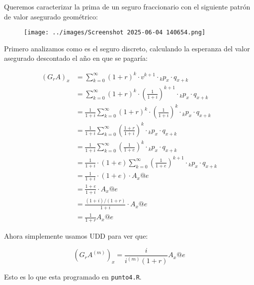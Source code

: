 Queremos caracterizar la prima de un seguro fraccionario con el siguiente patrón de valor asegurado geométrico:

\begin{figure}[H]
    \centering
    \texttt{[image: ../images/Screenshot 2025-06-04 140654.png]}
\end{figure}

Primero analizamos como es el seguro discreto, calculando la esperanza del valor asegurado descontado el año en que se pagaría: 

\begin{align*}
    (G_rA)_x &= \sum_{k=0}^{\infty} (1+r)^k \cdot v^{k+1} \cdot {}_k p_x \cdot q_{x+k} \\
    &= \sum_{k=0}^{\infty} (1+r)^k \cdot \left(\frac{1}{1+i}\right)^{k+1} \cdot {}_k p_x \cdot q_{x+k} \\
    &= \frac{1}{1+i} \sum_{k=0}^{\infty} (1+r)^k \cdot \left(\frac{1}{1+i}\right)^k \cdot {}_k p_x \cdot q_{x+k} \\
    &= \frac{1}{1+i} \sum_{k=0}^{\infty} \left(\frac{1+r}{1+i}\right)^k \cdot {}_k p_x \cdot q_{x+k} \\
    &= \frac{1}{1+i} \sum_{k=0}^{\infty} \left(\frac{1}{1+e}\right)^k \cdot {}_k p_x \cdot q_{x+k} \\
    &= \frac{1}{1+i} \cdot (1+e) \sum_{k=0}^{\infty} \left(\frac{1}{1+e}\right)^{k+1} \cdot {}_k p_x \cdot q_{x+k} \\
    &= \frac{1}{1+i} \cdot (1+e) \cdot A_x@e \\
    &= \frac{1+e}{1+i} \cdot A_x@e \\
    &= \frac{(1+i)/(1+r)}{1+i} \cdot A_x@e \\
    &= \frac{1}{1+r} A_x@e
\end{align*}

Ahora simplemente usamos UDD para ver que:

\begin{equation*}
    (G_rA^{(m)})_x = \frac{i}{i^{(m)}(1+r)} A_x@e
\end{equation*}

Esto es lo que esta programado en \texttt{punto4.R}.